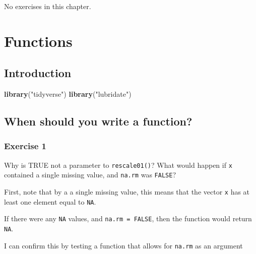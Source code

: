\documentclass[]{book}
\newenvironment{Shaded}{\begin{snugshade}}{\end{snugshade}}
\newcommand{\KeywordTok}[1]{\textcolor[rgb]{0.13,0.29,0.53}{\textbf{#1}}}
\newcommand{\NormalTok}[1]{#1}
\newcommand{\StringTok}[1]{\textcolor[rgb]{0.31,0.60,0.02}{#1}}
\theoremstyle{definition}
\theoremstyle{definition}
\theoremstyle{definition}
\theoremstyle{remark}
\begin{document}
No exercises in this chapter.

\hypertarget{functions}{%
\chapter{Functions}\label{functions}}

\hypertarget{introduction-11}{%
\section{Introduction}\label{introduction-11}}

\begin{Shaded}
\begin{Highlighting}[]
\KeywordTok{library}\NormalTok{(}\StringTok{"tidyverse"}\NormalTok{)}
\KeywordTok{library}\NormalTok{(}\StringTok{"lubridate"}\NormalTok{)}
\end{Highlighting}
\end{Shaded}

\hypertarget{when-should-you-write-a-function}{%
\section{When should you write a
function?}\label{when-should-you-write-a-function}}

\hypertarget{exercise-1-44}{%
\subsection{Exercise 1}\label{exercise-1-44}}

Why is TRUE not a parameter to \texttt{rescale01()}? What would happen
if \texttt{x} contained a single missing value, and \texttt{na.rm} was
\texttt{FALSE}?

First, note that by a a single missing value, this means that the vector
\texttt{x} has at least one element equal to \texttt{NA}.

If there were any \texttt{NA} values, and \texttt{na.rm\ =\ FALSE}, then
the function would return \texttt{NA}.

I can confirm this by testing a function that allows for \texttt{na.rm}
as an argument
\end{document}
